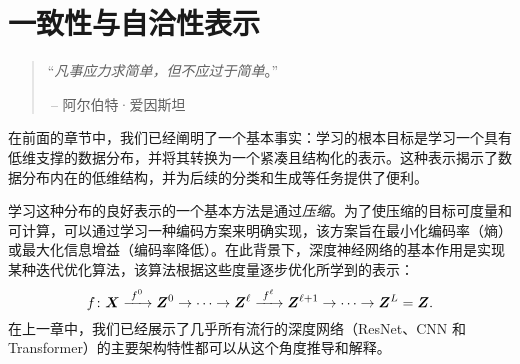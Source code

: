 \documentclass[../../book-main.tex]{subfiles}
\begin{document}
\chapter{一致性与自洽性表示}
\label{ch:consistent}\label{ch:autoencoding}
\label{ch:self-consistent}\label{ch:closed-loop}

\begin{quote}
\hfill  ``{\em 凡事应力求简单，但不应过于简单}。''

$~$\hfill -- 阿尔伯特·爱因斯坦
\end{quote}



\vspace{5mm}


在前面的章节中，我们已经阐明了一个基本事实：学习的根本目标是学习一个具有低维支撑的数据分布，并将其转换为一个紧凑且结构化的表示。这种表示揭示了数据分布内在的低维结构，并为后续的分类和生成等任务提供了便利。

学习这种分布的良好表示的一个基本方法是通过{\em 压缩}。为了使压缩的目标可度量和可计算，可以通过学习一种编码方案来明确实现，该方案旨在最小化编码率（熵）或最大化信息增益（编码率降低）。在此背景下，深度神经网络的基本作用是实现某种迭代优化算法，该算法根据这些度量逐步优化所学到的表示：
\begin{equation}
  f\colon \bm{X}
  \xrightarrow{\hspace{1mm} f^0 \hspace{1mm}} \bm{Z}^0 \rightarrow \cdots
  \rightarrow \bm{Z}^\ell \xrightarrow{\hspace{1mm} f^\ell \hspace{1mm}}
  \bm{Z}^{\ell+1} \rightarrow  \cdots \to \bm{Z}^L = \bm{Z}.
\end{equation}
在上一章中，我们已经展示了几乎所有流行的深度网络（ResNet、CNN 和 Transformer）的主要架构特性都可以从这个角度推导和解释。
\end{document}
